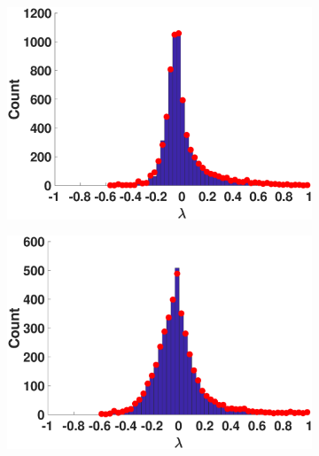 \begin{figure}[ht]
\begin{subfigure}[t]{0.19\textwidth}
    \includegraphics[width=\textwidth,trim = .4cm 0.5cm 3.5cm 1.3cm,clip]
    {./ndos/pics/marvel}
    \label{fig:marvel_dos}
  \end{subfigure}
  \begin{subfigure}[t]{0.19\textwidth}
    \centering  
    \captionsetup{justification=centering,font=scriptsize}
    \includegraphics[width=\textwidth,trim = .4cm 0.5cm 3.5cm 1.3cm,clip]
    {./ndos/pics/facebook}
    \label{fig:facebook_dos}
  \end{subfigure}
  \begin{subfigure}[t]{0.19\textwidth}
    \centering  
    \captionsetup{justification=centering,font=scriptsize}

\end{subfigure}
\end{figure}
